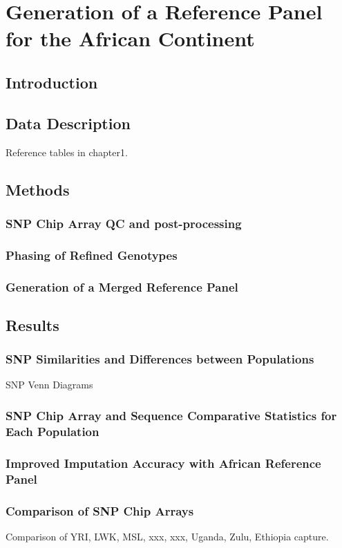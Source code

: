 \chapter{Generation of a Reference Panel for the African Continent}
\ifpdf
    \graphicspath{{Chapter2/Chapter2Figs/PNG/}{Chapter2/Chapter2Figs/PDF/}{Chapter2/Chapter2Figs/}}
\else
    \graphicspath{{Chapter2/Chapter2Figs/EPS/}{Chapter2/Chapter2Figs/}}
\fi

\section{Introduction}
\section{Data Description}
Reference tables in chapter1.
\section{Methods}
\subsection{SNP Chip Array QC and post-processing}
\subsection{Phasing of Refined Genotypes}
\subsection{Generation of a Merged Reference Panel}
\section{Results}
\subsection{SNP Similarities and Differences between Populations}
SNP Venn Diagrams
\subsection{SNP Chip Array and Sequence Comparative Statistics for Each Population}
\subsection{Improved Imputation Accuracy with African Reference Panel}
\subsection{Comparison of SNP Chip Arrays}
Comparison of YRI, LWK, MSL, xxx, xxx, Uganda, Zulu, Ethiopia capture.
